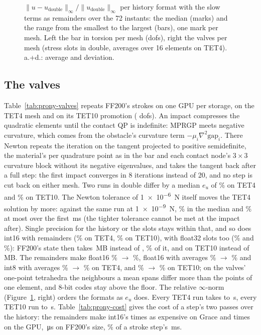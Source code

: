 \documentclass[sigconf,nonacm]{acmart}
\begin{document}
\begin{figure}
\centering

\caption{$\lVert u-u_{\mathrm{double}}\rVert_\infty/\lVert u_{\mathrm{double}}\rVert_\infty$ per history
format with the slow terms as remainders over the 72 instants: the median (marks) and the range
from the smallest to the largest (bars), one mark per mesh. Left the bar in torsion per mesh (dofs), right the
valves per mesh (stress slots in double, averages over 16 elements on TET4). a.+d.: average and
deviation.}
\label{fig:prony-infinity}
\end{figure}

\subsection{The valves}

Table~\ref{tab:prony-valves} repeats FF200's \trStrokes{} strokes on one GPU per storage, on the
TET4 mesh and on its TET10 promotion (\hsTenDofs{} dofs). An impact compresses the quadratic elements
until the contact QP is indefinite: MPRGP meets negative curvature, which comes from the obstacle's
curvature term $-\mu_i\nabla^2\mathrm{gap}_i$. There Newton repeats the iteration on the tangent
projected to positive semidefinite, the material's per quadrature point as in the bar and each
contact node's $3\times3$ curvature block without its negative eigenvalues, and takes the tangent
back after a full step: the first impact converges in 8 iterations instead of 20, and no step is
cut back on either mesh. Two runs in double differ by a median $e_u$ of \hsValveNoise\% on TET4 and
\hsTenNoise\% on TET10. The Newton tolerance of \SI{1e-6}{\newton} itself moves the TET4 solution
by more: against the same run at \SI{1e-9}{\newton}, \hsTolValve\% in the median and
\hsTolValveMax\% at most over the first \hsTolValveWindowMs\,\si{\milli\second} (the tighter
tolerance cannot be met at the impact after). Single precision for the history or the slots stays
within that, and so does int16 with remainders (\hsValveSixteen\% on TET4, \hsTenSixteen\% on TET10),
with float32 slots too (\hsValveSixteenSlots\% and \hsTenSixteenSlots\%): FF200's state then takes
\hsStateSixteenSlotsMB\,MB instead of \hsStateFullMB, \hsStateSixteenSlotsShare\% of it, and on TET10
\hsTenStateSixteenSlotsMB{} instead of \hsTenStateFullMB\,MB. The remainders make float16
\hsValveHalfPlain\% $\to$ \hsValveHalf\%, float16 with averages \hsValveHalfMdPlain\% $\to$
\hsValveHalfMd\% and int8 with averages \hsValveMdPlain\% $\to$ \hsValveMd\% on TET4, and
\hsTenMdPlain\% $\to$ \hsTenMd\% on TET10; on the valves' one-point tetrahedra the neighbours a mean
spans differ more than the points of one element, and 8-bit codes stay above the floor. The
relative $\infty$-norm (Figure~\ref{fig:prony-infinity}, right) orders the formats as $e_u$ does.
Every TET4 run takes \hsValveTimeMin{} to \hsValveTimeMax\,\si{\second}, every TET10 run
\hsTenTimeMin{} to \hsTenTimeMax\,\si{\second}. Table~\ref{tab:prony-cost} gives the cost of a step's
two passes over the history: the remainders make int16's \hsCostRemHost{} times as expensive on
Grace and \hsCostRemDevice{} times on the GPU, \hsCostSixteenDeviceUs\,\si{\micro\second} on FF200's
size, \hsCostShare\% of a stroke step's \hsStepMs\,\si{\milli\second}.
\end{document}
